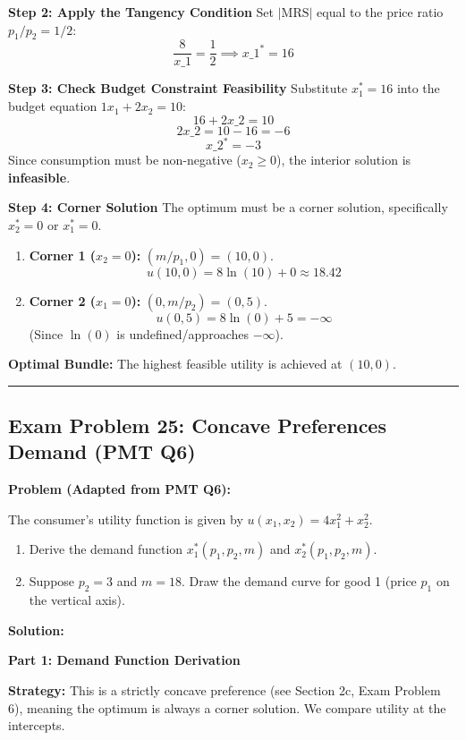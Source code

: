 \documentclass{article}
\begin{document}
\textbf{Step 2: Apply the Tangency Condition}
Set $|\text{MRS}|$ equal to the price ratio $p_1/p_2 = 1/2$:
\[ \frac{8}{x\_1} = \frac{1}{2} \implies x\_1^* = 16 \]

\textbf{Step 3: Check Budget Constraint Feasibility}
Substitute $x_1^*=16$ into the budget equation $1x_1 + 2x_2 = 10$:
\[ 16 + 2x\_2 = 10 \]
\[ 2x\_2 = 10 - 16 = -6 \]
\[ x\_2^* = -3 \]
Since consumption must be non-negative ($x_2 \geq 0$), the interior solution is \textbf{infeasible}.

\textbf{Step 4: Corner Solution}
The optimum must be a corner solution, specifically $x_2^*=0$ or $x_1^* =0$.

\begin{enumerate}
\item \textbf{Corner 1 ($x_2=0$):} $(m/p_1, 0) = (10, 0)$.
\[ u(10, 0) = 8 \ln(10) + 0 \approx 18.42 \]
\item \textbf{Corner 2 ($x_1=0$):} $(0, m/p_2) = (0, 5)$.
\[ u(0, 5) = 8 \ln(0) + 5 = -\infty \]
(Since $\ln(0)$ is undefined/approaches $-\infty$).
\end{enumerate}

\textbf{Optimal Bundle:} The highest feasible utility is achieved at $(10, 0)$.

\vspace{1em}\hrule\vspace{1em}

\subsection*{Exam Problem 25: Concave Preferences Demand (PMT Q6)}

\textbf{Problem (Adapted from PMT Q6):}

The consumer's utility function is given by $u(x_1, x_2) = 4x_1^2 + x_2^2$.
\begin{enumerate}
\item Derive the demand function $x_1^*(p_1, p_2, m)$ and $x_2^*(p_1, p_2, m)$.
\item Suppose $p_2 = 3$ and $m = 18$. Draw the demand curve for good 1 (price $p_1$ on the vertical axis).
\end{enumerate}

\textbf{Solution:}

\textbf{Part 1: Demand Function Derivation}

\textbf{Strategy:} This is a strictly concave preference (see Section 2c, Exam Problem 6), meaning the optimum is always a corner solution. We compare utility at the intercepts.
\end{document}
